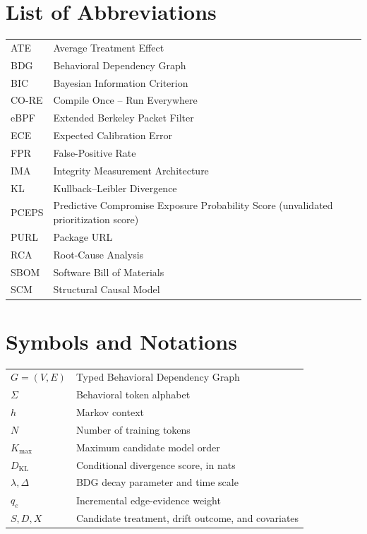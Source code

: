 \documentclass[12pt,a4paper,oneside]{report}
\begin{document}
\chapter*{List of Abbreviations}
\begin{longtable}{p{1.3in}p{4.8in}}ATE&Average Treatment Effect\\BDG&Behavioral Dependency Graph\\BIC&Bayesian Information Criterion\\CO-RE&Compile Once -- Run Everywhere\\eBPF&Extended Berkeley Packet Filter\\ECE&Expected Calibration Error\\FPR&False-Positive Rate\\IMA&Integrity Measurement Architecture\\KL&Kullback--Leibler Divergence\\PCEPS&Predictive Compromise Exposure Probability Score (unvalidated prioritization score)\\PURL&Package URL\\RCA&Root-Cause Analysis\\SBOM&Software Bill of Materials\\SCM&Structural Causal Model\end{longtable}
\chapter*{Symbols and Notations}
\begin{longtable}{p{1.3in}p{4.8in}}$G=(V,E)$&Typed Behavioral Dependency Graph\\$\Sigma$&Behavioral token alphabet\\$h$&Markov context\\$N$&Number of training tokens\\$K_{\max}$&Maximum candidate model order\\$D_{\mathrm{KL}}$&Conditional divergence score, in nats\\$\lambda,\Delta$&BDG decay parameter and time scale\\$q_e$&Incremental edge-evidence weight\\$S,D,X$&Candidate treatment, drift outcome, and covariates\end{longtable}
\end{document}
